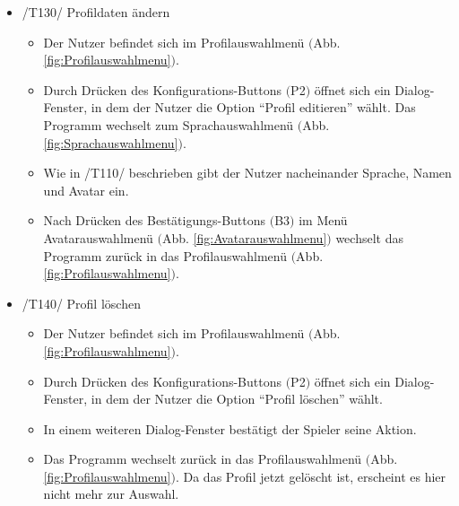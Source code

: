 \begin{itemize}
\item /T130/ Profildaten ändern
\begin{itemize}
\item Der Nutzer befindet sich im Profilauswahlmenü $($Abb. \ref{fig:Profilauswahlmenu}$)$.
\item Durch Drücken des Konfigurations-Buttons $($P2$)$ öffnet sich ein Dialog-Fenster, in dem der Nutzer die Option "`Profil editieren"' wählt. Das Programm wechselt zum Sprachauswahlmenü $($Abb. \ref{fig:Sprachauswahlmenu}$)$. 
\item Wie in /T110/ beschrieben gibt der Nutzer nacheinander Sprache, Namen und Avatar ein.
\item Nach Drücken des Bestätigungs-Buttons $($B3$)$ im Menü Avatarauswahlmenü $($Abb. \ref{fig:Avatarauswahlmenu}$)$ wechselt das Programm zurück in das Profilauswahlmenü $($Abb. \ref{fig:Profilauswahlmenu}$)$.
\end{itemize}

\item /T140/ Profil löschen
\begin{itemize}
\item Der Nutzer befindet sich im Profilauswahlmenü $($Abb. \ref{fig:Profilauswahlmenu}$)$.
\item Durch Drücken des Konfigurations-Buttons $($P2$)$ öffnet sich ein Dialog-Fenster, in dem der Nutzer die Option "`Profil löschen"' wählt.
\item In einem weiteren Dialog-Fenster bestätigt der Spieler seine Aktion.
\item Das Programm wechselt zurück in das Profilauswahlmenü $($Abb. \ref{fig:Profilauswahlmenu}$)$. Da das Profil jetzt gelöscht ist, erscheint es hier nicht mehr zur Auswahl.
\end{itemize}


\end{itemize}
